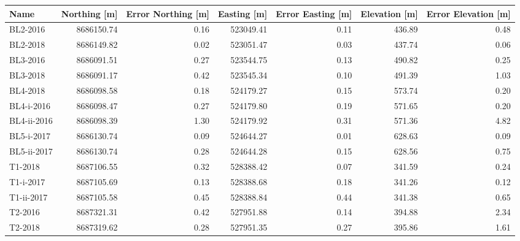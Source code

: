 \begin{tabular}{lrrrrrr}
\toprule
        Name &  Northing [m] &  Error Northing [m] &  Easting [m] &  Error Easting [m] &  Elevation [m] &  Error Elevation [m] \\
\midrule
    BL2-2016 &    8686150.74 &                0.16 &    523049.41 &               0.11 &         436.89 &                 0.48 \\
    BL2-2018 &    8686149.82 &                0.02 &    523051.47 &               0.03 &         437.74 &                 0.06 \\
    BL3-2016 &    8686091.51 &                0.27 &    523544.75 &               0.13 &         490.82 &                 0.25 \\
    BL3-2018 &    8686091.17 &                0.42 &    523545.34 &               0.10 &         491.39 &                 1.03 \\
    BL4-2018 &    8686098.58 &                0.18 &    524179.27 &               0.15 &         573.74 &                 0.20 \\
  BL4-i-2016 &    8686098.47 &                0.27 &    524179.80 &               0.19 &         571.65 &                 0.20 \\
 BL4-ii-2016 &    8686098.39 &                1.30 &    524179.92 &               0.31 &         571.36 &                 4.82 \\
  BL5-i-2017 &    8686130.74 &                0.09 &    524644.27 &               0.01 &         628.63 &                 0.09 \\
 BL5-ii-2017 &    8686130.74 &                0.28 &    524644.28 &               0.15 &         628.56 &                 0.75 \\
     T1-2018 &    8687106.55 &                0.32 &    528388.42 &               0.07 &         341.59 &                 0.24 \\
   T1-i-2017 &    8687105.69 &                0.13 &    528388.68 &               0.18 &         341.26 &                 0.12 \\
  T1-ii-2017 &    8687105.58 &                0.45 &    528388.84 &               0.44 &         341.38 &                 0.65 \\
     T2-2016 &    8687321.31 &                0.42 &    527951.88 &               0.14 &         394.88 &                 2.34 \\
     T2-2018 &    8687319.62 &                0.28 &    527951.35 &               0.27 &         395.86 &                 1.61 \\

\end{tabular}
